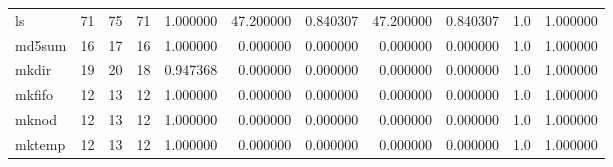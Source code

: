 \begin{tabular}{lrrrrrrrrrr}
ls        &                                      71 &                 75 &                                71 &                                   1.000000 &                              47.200000 &                                     0.840307 &                         47.200000 &                                0.840307 &                                1.0 &                                           1.000000 \\
md5sum    &                                      16 &                 17 &                                16 &                                   1.000000 &                               0.000000 &                                     0.000000 &                          0.000000 &                                0.000000 &                                1.0 &                                           1.000000 \\
mkdir     &                                      19 &                 20 &                                18 &                                   0.947368 &                               0.000000 &                                     0.000000 &                          0.000000 &                                0.000000 &                                1.0 &                                           1.000000 \\
mkfifo    &                                      12 &                 13 &                                12 &                                   1.000000 &                               0.000000 &                                     0.000000 &                          0.000000 &                                0.000000 &                                1.0 &                                           1.000000 \\
mknod     &                                      12 &                 13 &                                12 &                                   1.000000 &                               0.000000 &                                     0.000000 &                          0.000000 &                                0.000000 &                                1.0 &                                           1.000000 \\
mktemp    &                                      12 &                 13 &                                12 &                                   1.000000 &                               0.000000 &                                     0.000000 &                          0.000000 &                                0.000000 &                                1.0 &                                           1.000000 \\

\end{tabular}
